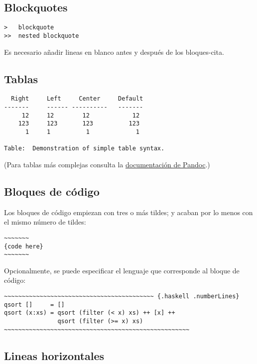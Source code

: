 \documentclass[12pt,spanish,]{article}
\begin{document}
\subsection{Blockquotes}\label{blockquotes}

\begin{verbatim}
>   blockquote
>>  nested blockquote
\end{verbatim}

Es necesario añadir lineas en blanco antes y después de los
bloques-cita.

\subsection{Tablas}\label{tablas}

\begin{verbatim}
  Right     Left     Center     Default
-------     ------ ----------   -------
     12     12        12            12
    123     123       123          123
      1     1          1             1

Table:  Demonstration of simple table syntax.
\end{verbatim}

(Para tablas más complejas consulta la
\href{http://pandoc.org/README.html\#tables}{documentación de Pandoc}.)

\subsection{Bloques de código}\label{bloques-de-cuxf3digo}

Los bloques de código empiezan con tres o más tildes; y acaban por lo
menos con el mismo número de tildes:

\begin{verbatim}
~~~~~~~
{code here}
~~~~~~~
\end{verbatim}

Opcionalmente, se puede especificar el lenguaje que corresponde al
bloque de código:

\begin{verbatim}
~~~~~~~~~~~~~~~~~~~~~~~~~~~~~~~~~~~~~~~~~~ {.haskell .numberLines}
qsort []     = []
qsort (x:xs) = qsort (filter (< x) xs) ++ [x] ++
               qsort (filter (>= x) xs)
~~~~~~~~~~~~~~~~~~~~~~~~~~~~~~~~~~~~~~~~~~~~~~~~~~~~
\end{verbatim}

\subsection{Lineas horizontales}\label{lineas-horizontales}
\end{document}
